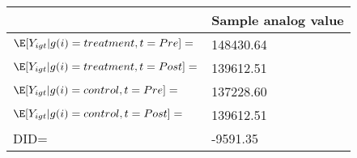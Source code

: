\begin{tabular}{ll}
\toprule
 & Sample analog value \\
\midrule
$\E[Y_{igt}|g(i)=treatment,t=Pre]=$ & 148430.64 \\
$\E[Y_{igt}|g(i)=treatment,t=Post]=$ & 139612.51 \\
$\E[Y_{igt}|g(i)=control,t=Pre]=$ & 137228.60 \\
$\E[Y_{igt}|g(i)=control,t=Post]=$ & 139612.51 \\
\midrule DID= & -9591.35 \\
\bottomrule
\end{tabular}
